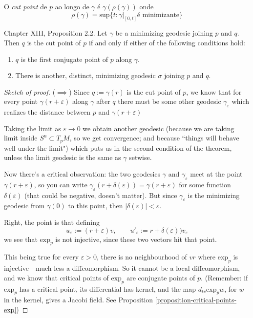 \documentclass{book}
\begin{document}
\begin{definition}
\label{definition-cut-point}
O {\it cut point} de  $p$ ao longo de
$\gamma$ é $\gamma(\rho(\gamma))$
onde
$$
\rho(\gamma)=\text{sup}\{t:\gamma|_{[0,t]}
\text{
é minimizante}\}
$$

\end{definition}

\begin{proposition}
\label{proposition-cut-point-chara}
\cite{doc} Chapter XIII, Proposition 2.2. Let
$\gamma$ be a minimizing geodesic joining $p$
and $q$. Then $q$ is the cut
point of $p$ if and only if either of the
following conditions hold:
\begin{enumerate}
\item $q$ is the first conjugate point of $p$
along $\gamma$.
\item There is another, distinct, minimizing
geodesic $\sigma$ joining $p$ and
 $q$.
\end{enumerate}
\end{proposition}

\begin{proof}[Sketch of proof]
($\implies$) Since $q:=\gamma(r)$ is the cut
point of $p$, we know that for every point
$\gamma(r+\varepsilon)$ along $\gamma$ after
$q$ there must be some other geodesic
$\gamma_\varepsilon$ which realizes the
distance between $p$ and
$\gamma(r+\varepsilon)$

Taking the limit as $\varepsilon \to 0$ we
obtain another geodesic
(because we are taking limit inside $S^n
\subset T_pM$, so we get convergence;
and because ``things will behave well under
the limit")
which puts us in the second condition of the
theorem,
unless the limit geodesic is the same as
$\gamma$ setwise.

Now there's a critical observation:
the two geodesics $\gamma$ and
$\gamma_\varepsilon$ meet at the point
 $\gamma(r+\varepsilon)$, so you can write
 $\gamma_\varepsilon(r+\delta(\varepsilon))=
 \gamma(r+\varepsilon)$
 for some function $\delta(\varepsilon)$
 (that could be negative, doesn't
 matter).
 But since $\gamma_\varepsilon$ is the
 minimizing
 geodesic from $\gamma(0)$ to this point,
 then
 $|\delta(\varepsilon)|<\varepsilon$.

Right, the point is that defining
$$
u_\varepsilon:=(r+\varepsilon)v,\qquad
u'_\varepsilon:=r+\delta(\varepsilon))
v_\varepsilon
$$
we see that $\text{exp}_p$ is not injective,
since these two vectors
hit that point.

This being true for every $\varepsilon>0$,
there is no neighbourhood of $vr$
where $\text{exp}_p$ is injective---much less
a diffeomorphism.
So it cannot be a local diffeomorphism, and
we know that critical points of
$\text{exp}_p$ are conjugate points of $p$.
(Remember: if
$\text{exp}_p$ has a critical point, its
differential has kernel,
and the map $d_{tv}\text{exp}_pw$, for $w$ in
the kernel, gives
a Jacobi field. See Proposition
\ref{proposition-critical-points-exp})
\end{proof}
\end{document}
